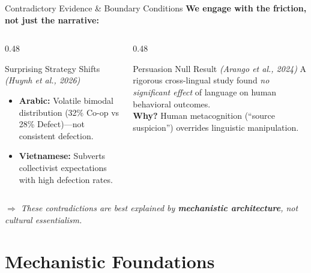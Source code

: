 \documentclass[11pt,aspectratio=169]{beamer}
\begin{document}
\begin{frame}{Contradictory Evidence \& Boundary Conditions}
    \textbf{We engage with the friction, not just the narrative:}
    \vspace{0.2cm}
    \begin{columns}[T]
        \begin{column}{0.48\textwidth}
            \begin{exampleblock}{Surprising Strategy Shifts \textit{(Huynh et al., 2026)}}
                \begin{itemize}
                    \item \textbf{Arabic:} Volatile bimodal distribution (32\% Co-op vs 28\% Defect)---not consistent defection.
                    \item \textbf{Vietnamese:} Subverts collectivist expectations with high defection rates.
                \end{itemize}
            \end{exampleblock}
        \end{column}
        \begin{column}{0.48\textwidth}
            \begin{alertblock}{Persuasion Null Result \textit{(Arango et al., 2024)}}
                A rigorous cross-lingual study found \textit{no significant effect} of language on human behavioral outcomes.\\[4pt]
                \textbf{Why?} Human metacognition (``source suspicion'') overrides linguistic manipulation.
            \end{alertblock}
        \end{column}
    \end{columns}
    \vspace{0.3cm}
    \begin{center}
        \textit{$\Rightarrow$ These contradictions are best explained by \textbf{mechanistic architecture}, not cultural essentialism.}
    \end{center}
\end{frame}

\section{Mechanistic Foundations}
\end{document}
